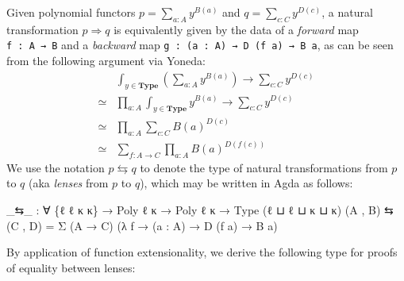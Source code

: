\documentclass[
  11pt,
  oneside,
  article]{memoir}
\newenvironment{Shaded}{}{}
\newcommand{\NormalTok}[1]{#1}
\newcommand{\OtherTok}[1]{\textcolor[rgb]{0.00,0.44,0.13}{#1}}
\theoremstyle{definition}
\theoremstyle{plain}
\newcommand{\0}{\textsf{0}}
\newcommand{\1}{\tn{\textsf{1}}}
\begin{document}
Given polynomial functors \(p = \sum_{a : A} y^{B(a)}\) and
\(q = \sum_{c : C} y^{D(c)}\), a natural transformation
\(p \Rightarrow q\) is equivalently given by the data of a
\emph{forward} map \texttt{f\ :\ A\ →\ B} and a \emph{backward} map
\texttt{g\ :\ (a\ :\ A)\ →\ D\ (f\ a)\ →\ B\ a}, as can be seen from the
following argument via Yoneda: \[
\begin{array}{rl}
& \int_{y \in \mathbf{Type}} \left( \sum_{a : A} y^{B(a)}  \right) \to \sum_{c : C} y^{D(c)}\\
\simeq & \prod_{a : A} \int_{y \in \mathbf{Type}} y^{B(a)} \to \sum_{c : C} y^{D(c)}\\
\simeq & \prod_{a : A} \sum_{c : C} B(a)^{D(c)}\\
\simeq & \sum_{f : A \to C} \prod_{a : A} B(a)^{D(f(c))}
\end{array}
\] We use the notation \(p \leftrightarrows q\) to denote the type of
natural transformations from \(p\) to \(q\) (aka \emph{lenses} from
\(p\) to \(q\)), which may be written in Agda as follows:

\begin{Shaded}
\begin{Highlighting}[]
\OtherTok{\_}\NormalTok{⇆}\OtherTok{\_} \OtherTok{:} \OtherTok{∀} \OtherTok{\{}\NormalTok{ℓ ℓ\textquotesingle{} κ κ\textquotesingle{}}\OtherTok{\}} \OtherTok{→}\NormalTok{ Poly ℓ κ }\OtherTok{→}\NormalTok{ Poly ℓ\textquotesingle{} κ\textquotesingle{} }\OtherTok{→}\NormalTok{ Type }\OtherTok{(}\NormalTok{ℓ ⊔ ℓ\textquotesingle{} ⊔ κ ⊔ κ\textquotesingle{}}\OtherTok{)}
\OtherTok{(}\NormalTok{A , B}\OtherTok{)}\NormalTok{ ⇆ }\OtherTok{(}\NormalTok{C , D}\OtherTok{)} \OtherTok{=}\NormalTok{ Σ }\OtherTok{(}\NormalTok{A }\OtherTok{→}\NormalTok{ C}\OtherTok{)} \OtherTok{(λ}\NormalTok{ f }\OtherTok{→} \OtherTok{(}\NormalTok{a }\OtherTok{:}\NormalTok{ A}\OtherTok{)} \OtherTok{→}\NormalTok{ D }\OtherTok{(}\NormalTok{f a}\OtherTok{)} \OtherTok{→}\NormalTok{ B a}\OtherTok{)}
\end{Highlighting}
\end{Shaded}

By application of function extensionality, we derive the following type
for proofs of equality between lenses:
\end{document}
